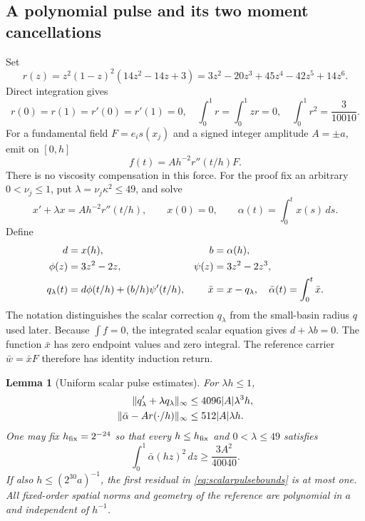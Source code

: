 \documentclass[11pt,a4paper]{amsart}
\newtheorem{lemma}[theorem]{Lemma}
\theoremstyle{definition}
\theoremstyle{remark}
\numberwithin{equation}{section}
\newcommand{\norm}[1]{\lVert #1\rVert}
\begin{document}
\subsection{A polynomial pulse and its two moment cancellations}
Set
\begin{equation}\label{eq:pulsepoly}
 r(z)=z^2(1-z)^2(14z^2-14z+3)
 =3z^2-20z^3+45z^4-42z^5+14z^6.
\end{equation}
Direct integration gives
\begin{equation}\label{eq:pulsemoments}
 r(0)=r(1)=r'(0)=r'(1)=0,\quad
 \int_0^1r=\int_0^1zr=0,\quad \int_0^1r^2=\frac3{10010}.
\end{equation}
For a fundamental field $F=e_i s(x_j)$ and a signed integer amplitude $A=\pm a$, emit on $[0,h]$
\begin{equation}\label{eq:stirforce}
 f(t)=Ah^{-2}r''(t/h)F.
\end{equation}
There is no viscosity compensation in this force. For the proof fix an arbitrary $0<\nu_j\le1$, put $\lambda=\nu_j\kappa^2\le49$, and solve
\[
 x'+\lambda x=Ah^{-2}r''(t/h),\qquad x(0)=0,\qquad
 \alpha(t)=\int_0^tx(s)\,ds.
\]
Define
\begin{align}\label{eq:pulsecorr}
 d&=x(h),& b&=\alpha(h),\notag\\
 \phi(z)&=3z^2-2z,&\psi(z)&=3z^2-2z^3,\notag\\
 q_\lambda(t)&=d\phi(t/h)+(b/h)\psi'(t/h),&
 \bar x&=x-q_\lambda,\quad \bar\alpha(t)=\int_0^t\bar x.
\end{align}
The notation distinguishes the scalar correction $q_\lambda$ from the small-basin radius $q$ used later. Because $\int f=0$, the integrated scalar equation gives $d+\lambda b=0$. The function $\bar x$ has zero endpoint values and zero integral. The reference carrier $\bar w=\bar xF$ therefore has identity induction return.

\begin{lemma}[Uniform scalar pulse estimates]\label{lem:pulse}
For $\lambda h\le1$,
\begin{align}\label{eq:scalarpulsebounds}
 \norm{q_\lambda'+\lambda q_\lambda}_\infty
 &\le4096|A|\lambda^3h,\notag\\
 \norm{\bar\alpha-Ar(\cdot/h)}_\infty
 &\le512|A|\lambda h.
\end{align}
One may fix $h_{\rm fix}=2^{-24}$ so that every $h\le h_{\rm fix}$ and $0<\lambda\le49$ satisfies
\begin{equation}\label{eq:profilelower}
 \int_0^1\bar\alpha(hz)^2\,dz\ge\frac{3A^2}{40040}.
\end{equation}
If also $h\le(2^{30}a)^{-1}$, the first residual in \eqref{eq:scalarpulsebounds} is at most one. All fixed-order spatial norms and geometry of the reference are polynomial in $a$ and independent of $h^{-1}$.
\end{lemma}
\end{document}

